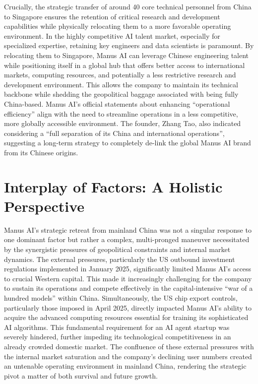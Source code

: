 Crucially, the strategic transfer of around 40 core technical personnel from China to Singapore ensures the retention of critical research and development capabilities while physically relocating them to a more favorable operating environment.
In the highly competitive AI talent market, especially for specialized expertise, retaining key engineers and data scientists is paramount.
By relocating them to Singapore, Manus AI can leverage Chinese engineering talent while positioning itself in a global hub that offers better access to international markets, computing resources, and potentially a less restrictive research and development environment.
This allows the company to maintain its technical backbone while shedding the geopolitical baggage associated with being fully China-based.
Manus AI's official statements about enhancing ``operational efficiency'' align with the need to streamline operations in a less competitive, more globally accessible environment.
The founder, Zhang Tao, also indicated considering a ``full separation of its China and international operations'', suggesting a long-term strategy to completely de-link the global Manus AI brand from its Chinese origins.

\section{Interplay of Factors: A Holistic Perspective}

Manus AI's strategic retreat from mainland China was not a singular response to one dominant factor but rather a complex, multi-pronged maneuver necessitated by the synergistic pressures of geopolitical constraints and internal market dynamics.
The external pressures, particularly the US outbound investment regulations implemented in January 2025, significantly limited Manus AI's access to crucial Western capital.
This made it increasingly challenging for the company to sustain its operations and compete effectively in the capital-intensive ``war of a hundred models'' within China.
Simultaneously, the US chip export controls, particularly those imposed in April 2025, directly impacted Manus AI's ability to acquire the advanced computing resources essential for training its sophisticated AI algorithms.
This fundamental requirement for an AI agent startup was severely hindered, further impeding its technological competitiveness in an already crowded domestic market.
The confluence of these external pressures with the internal market saturation and the company's declining user numbers created an untenable operating environment in mainland China, rendering the strategic pivot a matter of both survival and future growth.

